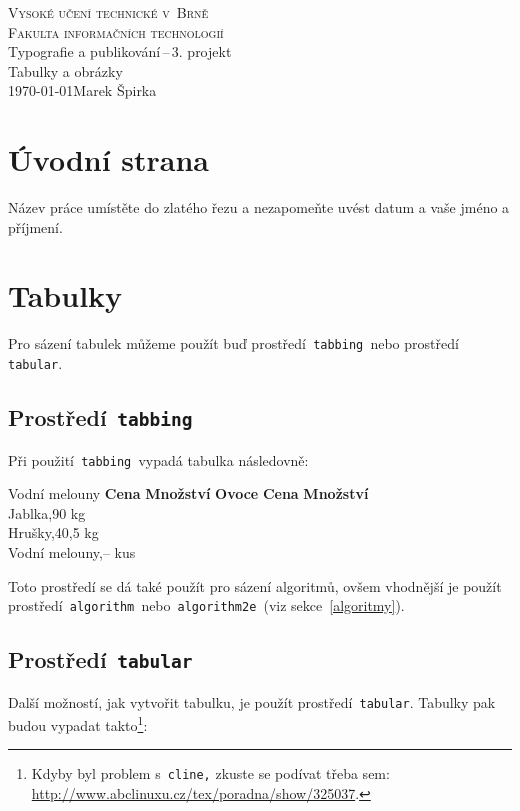 \documentclass[a4paper, 11pt]{article}
\begin{document}
    \begin{titlepage}
    	\begin{center}
    		\Huge{\textsc{Vysoké učení technické v~Brně}}\\
    	    \huge{\textsc{Fakulta informačních technologií}}\\
    	\LARGE{Typografie a publikování\,–\,3. projekt}\\ 
    		\Huge{Tabulky a obrázky}\\
    	    \Large \today \hfill Marek Špirka 
    	\end{center}
\end{titlepage}

\section{Úvodní strana}
    Název práce umístěte do zlatého řezu a nezapomeňte uvést  datum a vaše jméno a příjmení.

\section{Tabulky}
    Pro sázení tabulek můžeme použít buď prostředí\verb| tabbing |nebo prostředí\verb| tabular|.
    
\subsection{Prostředí\texttt{ tabbing}}
        Při použití\verb| tabbing |vypadá tabulka následovně:
\begin{tabbing}
	Vodní melouny \quad \=\textbf{Cena} \quad\= \textbf{Množství} \kill
	\textbf{Ovoce}\> \textbf{Cena}\> \textbf{Množství}\\
	Jablka,90 kg\\
	Hrušky,40,5 kg\\
	Vodní melouny,-- kus
\end{tabbing}

\bigskip

\noindent Toto prostředí se dá také použít pro sázení algoritmů, ovšem vhodnější je použít prostředí\verb| algorithm |nebo\, \verb|algorithm2e |(viz sekce~\ref*{algoritmy}).

\subsection{Prostředí\texttt{ tabular}}
Další možností, jak vytvořit tabulku, je použít prostředí\verb| tabular|. Tabulky pak budou vypadat takto\footnote{Kdyby byl problem s\texttt{ cline,} zkuste se podívat třeba sem: \href{http://www.abclinuxu.cz/tex/poradna/show/325037}{http://www.abclinuxu.cz/tex/poradna/show/325037}.}: \bigskip
\end{document}
